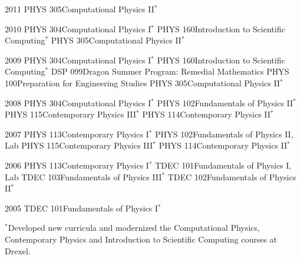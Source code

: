 \documentclass[]{scrartcl}
\begin{document}
\begin{cleanCV}


\newcommand{\TeachingNote}{$^*$}

\Teaching
{2011}
{PHYS 305}{Computational Physics II\TeachingNote}

\Teaching
{2010}
{PHYS 304}{Computational Physics I\TeachingNote}
\Teaching
{}
{PHYS 160}{Introduction to Scientific Computing\TeachingNote}
\Teaching
{}
{PHYS 305}{Computational Physics II\TeachingNote}

\Teaching
{2009}
{PHYS 304}{Computational Physics I\TeachingNote}
\Teaching
{}
{PHYS 160}{Introduction to Scientific Computing\TeachingNote}
\Teaching
{}
{DSP 099}{Dragon Summer Program: Remedial Mathematics}
\Teaching
{}
{PHYS 100}{Preparation for Engineering Studies}
\Teaching
{}
{PHYS 305}{Computational Physics II\TeachingNote}

\Teaching
{2008}
{PHYS 304}{Computational Physics I\TeachingNote}
\Teaching
{}
{PHYS 102}{Fundamentals of Physics II\TeachingNote}
\Teaching
{}
{PHYS 115}{Contemporary Physics III\TeachingNote}
\Teaching
{}
{PHYS 114}{Contemporary Physics II\TeachingNote}

\Teaching
{2007}
{PHYS 113}{Contemporary Physics I\TeachingNote}
\Teaching
{}
{PHYS 102}{Fundamentals of Physics II, Lab}
\Teaching
{}
{PHYS 115}{Contemporary Physics III\TeachingNote}
\Teaching
{}
{PHYS 114}{Contemporary Physics II\TeachingNote}

\Teaching
{2006}
{PHYS 113}{Contemporary Physics I\TeachingNote}
\Teaching
{}
{TDEC 101}{Fundamentals of Physics I, Lab}
\Teaching
{}
{TDEC 103}{Fundamentals of Physics III\TeachingNote}
\Teaching
{}
{TDEC 102}{Fundamentals of Physics II\TeachingNote}

\Teaching
{2005}
{TDEC 101}{Fundamentals of Physics I\TeachingNote}

\TeachingNote{\small Developed new curricula and modernized the Computational Physics, Contemporary Physics and Introduction to Scientific Computing courses at Drexel.}

\end{cleanCV}
\end{document}
